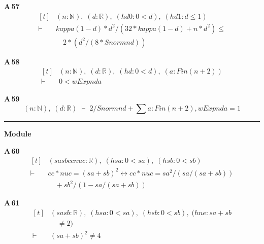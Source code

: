\noindent\textbf{A\,57}\quad{}
{\footnotesize\[ \begin{aligned}[t]
&(\mathit{n} : \mathbb{N} ),\; (\mathit{d} : \mathbb{R} ),\; (\mathit{hd0} : 0 < \mathit{d}),\; (\mathit{hd1} : \mathit{d} \leq 1)\\
\vdash\;&\mathit{kappa} (1-\mathit{d})*\mathit{d}^{2}/(32*\mathit{kappa} (1-\mathit{d}) + \mathit{n}*\mathit{d}^{2}) \leq\\
&\quad 2*(\mathit{d}^{2}/(8*\mathit{Snorm} \mathit{n} \mathit{d}))
\end{aligned} \]}

\noindent\textbf{A\,58}\quad{}
{\footnotesize\[ \begin{aligned}[t]
&(\mathit{n} : \mathbb{N} ),\; (\mathit{d} : \mathbb{R} ),\; (\mathit{hd} : 0 < \mathit{d}),\; (\mathit{a} : \mathit{Fin} (\mathit{n}+2))\\
\vdash\;&0 < \mathit{wExp} \mathit{n} \mathit{d} \mathit{a}
\end{aligned} \]}

\noindent\textbf{A\,59}\quad{}
{\footnotesize\[ (\mathit{n} : \mathbb{N} ),\; (\mathit{d} : \mathbb{R} ) \;\vdash\; 2/\mathit{Snorm} \mathit{n} \mathit{d} + \textstyle\sum \mathit{a} : \mathit{Fin} (\mathit{n}+2), \mathit{wExp} \mathit{n} \mathit{d} \mathit{a} = 1 \]}

\vspace{4pt}\noindent\rule{\columnwidth}{0.4pt}\par\vspace{2pt}
\noindent\textbf{Module }\par\vspace{3pt}

\noindent\textbf{A\,60}\quad{}
{\footnotesize\[ \begin{aligned}[t]
&(\mathit{sa} \mathit{sb} \mathit{cc} \mathit{nuc} : \mathbb{R} ),\; (\mathit{hsa} : 0 < \mathit{sa}),\; (\mathit{hsb} : 0 < \mathit{sb})\\
\vdash\;&\mathit{cc} * \mathit{nuc} = (\mathit{sa} + \mathit{sb}) ^{2} \leftrightarrow \mathit{cc} * \mathit{nuc} = \mathit{sa} ^{2} / (\mathit{sa} / (\mathit{sa} + \mathit{sb}))\\
&\quad + \mathit{sb} ^{2} / (1 - \mathit{sa} / (\mathit{sa} + \mathit{sb}))
\end{aligned} \]}

\noindent\textbf{A\,61}\quad{}
{\footnotesize\[ \begin{aligned}[t]
&(\mathit{sa} \mathit{sb} : \mathbb{R} ),\; (\mathit{hsa} : 0 < \mathit{sa}),\; (\mathit{hsb} : 0 < \mathit{sb}),\; (\mathit{hne} : \mathit{sa} + \mathit{sb}\\
&\quad \neq 2)\\
\vdash\;&(\mathit{sa} + \mathit{sb}) ^{2} \neq 4
\end{aligned} \]}

